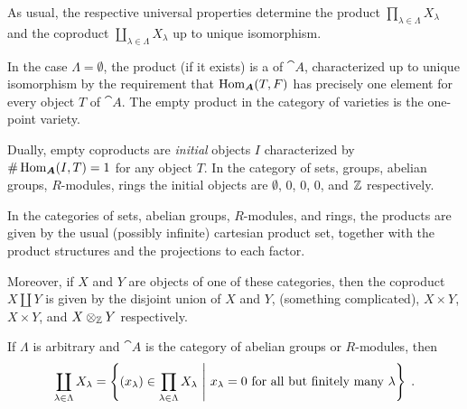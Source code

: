 \documentclass[a4paper,parskip=half,numbers=enddot, DIV=12]{scrreprt}
\begin{document}
\begin{rem}
	\begin{alphanumerate}
		\item As usual, the respective universal properties determine the product $\prod_{\lambda\in\Lambda}X_\lambda$ and the coproduct $\coprod_{\lambda\in\Lambda} X_\lambda$ up to unique isomorphism.
		\item  In the case $\Lambda=\emptyset$, the product (if it exists) is a  of $\cat A$, characterized up to unique isomorphism by the requirement that $\Hom_{\cat A}(T,F)$ has precisely one element for every object $T$ of ${\cat A}$. The empty product in the category of varieties is the one-point variety.
		
		Dually, empty coproducts are \emph{initial} objects $I$ characterized by $\#\Hom_{\cat A}(I,T) = 1$ for any object $T$. In the category of sets, groups, abelian groups, $R$-modules, rings the initial objects are $\emptyset$, $0$, $0$, $0$, and $\mathbb{Z}$ respectively.
		\item In the categories of sets, abelian groups, $R$-modules, and rings, the products are given by the usual (possibly infinite) cartesian product set, together with the product structures and the projections to each factor. 
		
		Moreover, if $X$ and $Y$ are objects of one of these categories, then the coproduct $X\amalg Y$ is given by the disjoint union of $X$ and $Y$, (something complicated), $X\times Y$, $X\times Y$, and $X\otimes_{\mathbb{Z}} Y$ respectively.
		
		\item If $\Lambda$ is arbitrary and $\cat A$ is the category of abelian groups or $R$-modules, then
		\begin{align*}
		\coprod_{\lambda\in \Lambda}X_\lambda = \left\{(x_\lambda) \in \prod_{\lambda\in \Lambda} X_\lambda\ \middle|\  x_\lambda = 0 \text{ for all but finitely many } \lambda \right\}\;.
		\end{align*}
	\end{alphanumerate}
\end{rem}
	
	
	\printbibliography
	

\end{document}
